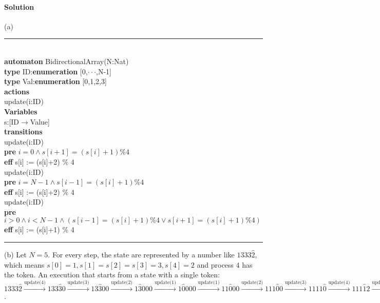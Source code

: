 \documentclass[11pt]{article}
\newcommand{\tab}{\hspace*{5mm}}
\begin{document}
\paragraph{Solution}

(a)

\noindent\rule{7cm}{1.0pt}\\
\textbf{automaton} BidirectionalArray(N:Nat)\\
\tab\textbf{type} ID:\textbf{enumeration} [0,$\cdot\cdot\cdot$,N-1]\\
\tab\textbf{type} Val:\textbf{enumeration} [0,1,2,3]\\
\tab\textbf{actions}\\
\tab\tab update(i:ID)\\
\tab\textbf{Variables}\\
\tab\tab s:[ID$\rightarrow$Value]\\
\tab\textbf{transitions}\\
\tab\tab update(i:ID)\\
\tab\tab\tab\textbf{pre} $i = 0 \wedge s[i+1] = (s[i]+1) \% 4$\\
\tab\tab\tab\textbf{eff} s[i] := (s[i]+2) \% 4\\
\tab\tab update(i:ID)\\
\tab\tab\tab\textbf{pre} $i = N-1 \wedge s[i-1] = (s[i]+1) \% 4$\\
\tab\tab\tab\textbf{eff} s[i] := (s[i]+2) \% 4\\
\tab\tab update(i:ID)\\
\tab\tab\tab\textbf{pre} $i > 0 \wedge i < N-1 \wedge (s[i-1] = (s[i]+1) \% 4 \vee s[i+1] = (s[i]+1) \% 4)$\\
\tab\tab\tab\textbf{eff} s[i] := (s[i]+1) \% 4\\
\noindent\rule{7cm}{1.0pt}

(b) Let $N=5$. For every step, the state are represented by a number like $1333\hat{2}$, which means $s[0]=1,s[1]=s[2]=s[3]=3,s[4]=2$ and process 4 has the token. An execution that starts from a state with a single token: $1333\hat{2} \xrightarrow{\text{update(4)}} 133\hat{3}0 \xrightarrow{\text{update(3)}} 13\hat{3}00 \xrightarrow{\text{update(2)}} 1\hat{3}000 \xrightarrow{\text{update(1)}} 1\hat{0}000 \xrightarrow{\text{update(1)}} 11\hat{0}00 \xrightarrow{\text{update(2)}} 111\hat{0}0 \xrightarrow{\text{update(3)}} 1111\hat{0} \xrightarrow{\text{update(4)}} 111\hat{1}2 \xrightarrow{\text{update(3)}} \dots$.
\end{document}
